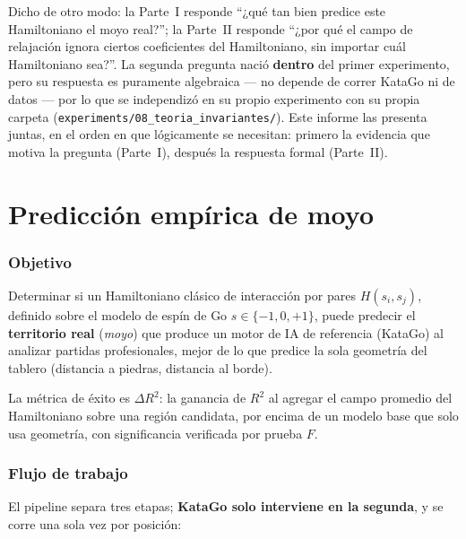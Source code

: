 \documentclass[11pt, a4paper]{article}
\begin{document}
Dicho de otro modo: la Parte~I responde ``¿qu\'e tan bien predice este
Hamiltoniano el moyo real?''; la Parte~II responde ``¿por qu\'e el
campo de relajaci\'on ignora ciertos coeficientes del Hamiltoniano, sin
importar cu\'al Hamiltoniano sea?''. La segunda pregunta naci\'o
\textbf{dentro} del primer experimento, pero su respuesta es puramente
algebraica --- no depende de correr KataGo ni de datos --- por lo que
se independiz\'o en su propio experimento con su propia carpeta
(\texttt{experiments/08\_teoria\_invariantes/}). Este informe las
presenta juntas, en el orden en que l\'ogicamente se necesitan: primero
la evidencia que motiva la pregunta (Parte~I), despu\'es la respuesta
formal (Parte~II).

\part{Predicci\'on emp\'irica de moyo}
\label{part:07}

\section{Objetivo}

Determinar si un Hamiltoniano cl\'asico de interacci\'on por pares
$H(s_i,s_j)$, definido sobre el modelo de esp\'in de Go
$s\in\{-1,0,+1\}$, puede predecir el \textbf{territorio real} (\emph{moyo})
que produce un motor de IA de referencia (KataGo) al analizar partidas
profesionales, mejor de lo que predice la sola geometr\'ia del tablero
(distancia a piedras, distancia al borde).

La m\'etrica de \'exito es $\Delta R^2$: la ganancia de $R^2$ al agregar
el campo promedio del Hamiltoniano sobre una regi\'on candidata,
por encima de un modelo base que solo usa geometr\'ia, con significancia
verificada por prueba $F$.

\section{Flujo de trabajo}

El pipeline separa tres etapas; \textbf{KataGo solo interviene en la
segunda}, y se corre una sola vez por posici\'on:
\end{document}
